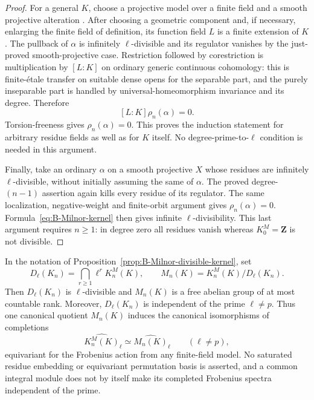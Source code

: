 \begin{proof}
For a general $K$, choose a projective model over a finite field and
a smooth projective alteration
\citep[Theorem~4.1 and Remark~4.2]{c_dejong1996}.
After choosing a geometric component and, if necessary, enlarging
the finite field of definition, its function field $L$ is a finite
extension of $K$.  The pullback of $\alpha$ is infinitely
$\ell$-divisible and its regulator vanishes by the just-proved
smooth-projective case.  Restriction followed by corestriction is
multiplication by $[L:K]$ on ordinary generic continuous cohomology:
this is finite-\'etale transfer on suitable dense opens for the
separable part, and the purely inseparable part is handled by
universal-homeomorphism invariance and its degree.  Therefore
\[
 [L:K]\rho_n(\alpha)=0.
\]
Torsion-freeness gives $\rho_n(\alpha)=0$.  This proves the induction
statement for arbitrary residue fields as well as for $K$ itself.
No degree-prime-to-$\ell$ condition is needed in this argument.

Finally, take an ordinary $\alpha$ on a smooth projective $X$ whose
residues are infinitely $\ell$-divisible, without initially assuming
the same of $\alpha$.  The proved degree-$(n-1)$ assertion again
kills every residue of its regulator.  The same localization,
negative-weight and finite-orbit argument gives
$\rho_n(\alpha)=0$.  Formula~\eqref{eq:B-Milnor-kernel} then gives
infinite $\ell$-divisibility.  This last argument requires $n\ge1$:
in degree zero all residues vanish whereas $K_0^M=\mathbf Z$ is not
divisible.
\end{proof}

\begin{corollary}
\label{cor:B-Milnor-free-quotient}
In the notation of Proposition~\ref{prop:B-Milnor-divisible-kernel}, set
\[
 D_\ell(K_n)=\bigcap_{r\ge1}\ell^rK_n^M(K),\qquad
 M_n(K)=K_n^M(K)/D_\ell(K_n).
\]
Then $D_\ell(K_n)$ is $\ell$-divisible and $M_n(K)$ is a free abelian
group of at most countable rank.  Moreover, $D_\ell(K_n)$ is independent
of the prime $\ell\ne p$.  Thus one canonical quotient $M_n(K)$
induces the canonical isomorphisms of completions
\[
 \widehat{K_n^M(K)}_\ell\simeq\widehat{M_n(K)}_\ell
 \qquad(\ell\ne p),
\]
equivariant for the Frobenius action from any finite-field model.
No saturated residue embedding or equivariant permutation basis is
asserted, and a common integral module does not by itself make its
completed Frobenius spectra independent of the prime.
\end{corollary}

